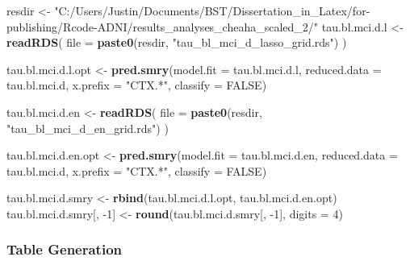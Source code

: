 \documentclass[
]{article}
\newenvironment{Shaded}{\begin{snugshade}}{\end{snugshade}}
\newcommand{\DataTypeTok}[1]{\textcolor[rgb]{0.13,0.29,0.53}{#1}}
\newcommand{\DecValTok}[1]{\textcolor[rgb]{0.00,0.00,0.81}{#1}}
\newcommand{\KeywordTok}[1]{\textcolor[rgb]{0.13,0.29,0.53}{\textbf{#1}}}
\newcommand{\NormalTok}[1]{#1}
\newcommand{\OtherTok}[1]{\textcolor[rgb]{0.56,0.35,0.01}{#1}}
\newcommand{\StringTok}[1]{\textcolor[rgb]{0.31,0.60,0.02}{#1}}
\begin{document}
\begin{Shaded}
\begin{Highlighting}[]
\NormalTok{resdir <-}\StringTok{ "C:/Users/Justin/Documents/BST/Dissertation_in_Latex/for-publishing/Rcode-ADNI/results_analyses_cheaha_scaled_2/"}
\NormalTok{tau.bl.mci.d.l <-}\StringTok{ }\KeywordTok{readRDS}\NormalTok{(}
  \DataTypeTok{file =} \KeywordTok{paste0}\NormalTok{(resdir, }\StringTok{"tau_bl_mci_d_lasso_grid.rds"}\NormalTok{)}
\NormalTok{)}

\NormalTok{tau.bl.mci.d.l.opt <-}\StringTok{ }\KeywordTok{pred.smry}\NormalTok{(}\DataTypeTok{model.fit =}\NormalTok{ tau.bl.mci.d.l,}
                       \DataTypeTok{reduced.data =}\NormalTok{ tau.bl.mci.d,}
                       \DataTypeTok{x.prefix =} \StringTok{"CTX.*"}\NormalTok{,}
                       \DataTypeTok{classify =} \OtherTok{FALSE}\NormalTok{)}

\NormalTok{tau.bl.mci.d.en <-}\StringTok{ }\KeywordTok{readRDS}\NormalTok{(}
  \DataTypeTok{file =} \KeywordTok{paste0}\NormalTok{(resdir, }\StringTok{"tau_bl_mci_d_en_grid.rds"}\NormalTok{)}
\NormalTok{)}

\NormalTok{tau.bl.mci.d.en.opt <-}\StringTok{ }\KeywordTok{pred.smry}\NormalTok{(}\DataTypeTok{model.fit =}\NormalTok{ tau.bl.mci.d.en,}
                       \DataTypeTok{reduced.data =}\NormalTok{ tau.bl.mci.d,}
                       \DataTypeTok{x.prefix =} \StringTok{"CTX.*"}\NormalTok{,}
                       \DataTypeTok{classify =} \OtherTok{FALSE}\NormalTok{)}

\NormalTok{tau.bl.mci.d.smry <-}\StringTok{ }\KeywordTok{rbind}\NormalTok{(tau.bl.mci.d.l.opt,}
\NormalTok{                          tau.bl.mci.d.en.opt)}
\NormalTok{tau.bl.mci.d.smry[, }\DecValTok{-1}\NormalTok{] <-}\StringTok{ }\KeywordTok{round}\NormalTok{(tau.bl.mci.d.smry[, }\DecValTok{-1}\NormalTok{], }\DataTypeTok{digits =} \DecValTok{4}\NormalTok{)}
\end{Highlighting}
\end{Shaded}

\hypertarget{table-generation-1}{%
\subsubsection{Table Generation}\label{table-generation-1}}
\end{document}
